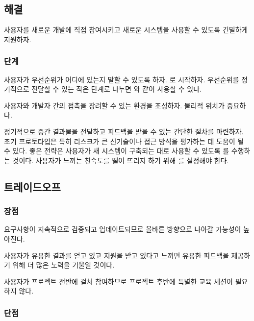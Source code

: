 \documentclass[a4paper,10pt,twoside]{book}
\begin{document}
\subsection*{해결}

사용자를 새로운 개발에 직접 참여시키고 새로운 시스템을 사용할 수 있도록 긴밀하게 지원하자.

\subsubsection*{단계}

사용자가 우선순위가 어디에 있는지 말할 수 있도록 하자. 로 시작하자. 우선순위를 정기적으로 전달할 수 있는 작은 단계로 나누면 와 같이 사용할 수 있다.

사용자와 개발자 간의 접촉을 장려할 수 있는 환경을 조성하자. 물리적 위치가 중요하다.

정기적으로 중간 결과물을 전달하고 피드백을 받을 수 있는 간단한 절차를 마련하자. 초기 프로토타입은 특히 리스크가 큰 신기술이나 접근 방식을 평가하는 데 도움이 될 수 있다. 좋은 전략은 사용자가 새 시스템이 구축되는 대로 사용할 수 있도록 를 수행하는 것이다. 사용자가 느끼는 친숙도를 떨어 뜨리지 하기 위해 를 설정해야 한다.

\subsection*{트레이드오프}

\subsubsection*{장점}

\begin{bulletlist}
\item 요구사항이 지속적으로 검증되고 업데이트되므로 올바른 방향으로 나아갈 가능성이 높아진다.

\item 사용자가 유용한 결과를 얻고 있고 지원을 받고 있다고 느끼면 유용한 피드백을 제공하기 위해 더 많은 노력을 기울일 것이다.

\item 사용자가 프로젝트 전반에 걸쳐 참여하므로 프로젝트 후반에 특별한 교육 세션이 필요하지 않다.
\end{bulletlist}

\subsubsection*{단점}
\end{document}
